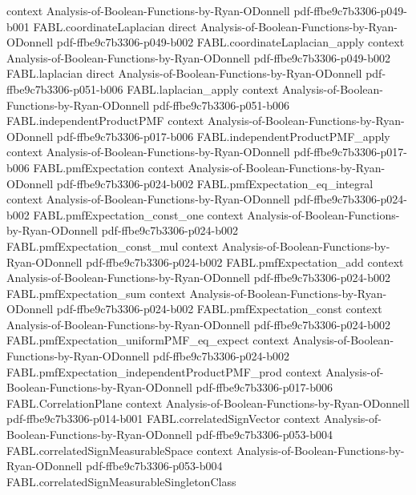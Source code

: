\begin{theorem}
  {context}
  {Analysis-of-Boolean-Functions-by-Ryan-ODonnell}
  {pdf-ffbe9c7b3306-p049-b001}
\proofstep
  {FABL.coordinateLaplacian}
  {direct}
  {Analysis-of-Boolean-Functions-by-Ryan-ODonnell}
  {pdf-ffbe9c7b3306-p049-b002}
\proofstep
  {FABL.coordinateLaplacian_apply}
  {context}
  {Analysis-of-Boolean-Functions-by-Ryan-ODonnell}
  {pdf-ffbe9c7b3306-p049-b002}
\proofstep
  {FABL.laplacian}
  {direct}
  {Analysis-of-Boolean-Functions-by-Ryan-ODonnell}
  {pdf-ffbe9c7b3306-p051-b006}
\proofstep
  {FABL.laplacian_apply}
  {context}
  {Analysis-of-Boolean-Functions-by-Ryan-ODonnell}
  {pdf-ffbe9c7b3306-p051-b006}
\proofstep
  {FABL.independentProductPMF}
  {context}
  {Analysis-of-Boolean-Functions-by-Ryan-ODonnell}
  {pdf-ffbe9c7b3306-p017-b006}
\proofstep
  {FABL.independentProductPMF_apply}
  {context}
  {Analysis-of-Boolean-Functions-by-Ryan-ODonnell}
  {pdf-ffbe9c7b3306-p017-b006}
\proofstep
  {FABL.pmfExpectation}
  {context}
  {Analysis-of-Boolean-Functions-by-Ryan-ODonnell}
  {pdf-ffbe9c7b3306-p024-b002}
\proofstep
  {FABL.pmfExpectation_eq_integral}
  {context}
  {Analysis-of-Boolean-Functions-by-Ryan-ODonnell}
  {pdf-ffbe9c7b3306-p024-b002}
\proofstep
  {FABL.pmfExpectation_const_one}
  {context}
  {Analysis-of-Boolean-Functions-by-Ryan-ODonnell}
  {pdf-ffbe9c7b3306-p024-b002}
\proofstep
  {FABL.pmfExpectation_const_mul}
  {context}
  {Analysis-of-Boolean-Functions-by-Ryan-ODonnell}
  {pdf-ffbe9c7b3306-p024-b002}
\proofstep
  {FABL.pmfExpectation_add}
  {context}
  {Analysis-of-Boolean-Functions-by-Ryan-ODonnell}
  {pdf-ffbe9c7b3306-p024-b002}
\proofstep
  {FABL.pmfExpectation_sum}
  {context}
  {Analysis-of-Boolean-Functions-by-Ryan-ODonnell}
  {pdf-ffbe9c7b3306-p024-b002}
\proofstep
  {FABL.pmfExpectation_const}
  {context}
  {Analysis-of-Boolean-Functions-by-Ryan-ODonnell}
  {pdf-ffbe9c7b3306-p024-b002}
\proofstep
  {FABL.pmfExpectation_uniformPMF_eq_expect}
  {context}
  {Analysis-of-Boolean-Functions-by-Ryan-ODonnell}
  {pdf-ffbe9c7b3306-p024-b002}
\proofstep
  {FABL.pmfExpectation_independentProductPMF_prod}
  {context}
  {Analysis-of-Boolean-Functions-by-Ryan-ODonnell}
  {pdf-ffbe9c7b3306-p017-b006}
\proofstep
  {FABL.CorrelationPlane}
  {context}
  {Analysis-of-Boolean-Functions-by-Ryan-ODonnell}
  {pdf-ffbe9c7b3306-p014-b001}
\proofstep
  {FABL.correlatedSignVector}
  {context}
  {Analysis-of-Boolean-Functions-by-Ryan-ODonnell}
  {pdf-ffbe9c7b3306-p053-b004}
\proofstep
  {FABL.correlatedSignMeasurableSpace}
  {context}
  {Analysis-of-Boolean-Functions-by-Ryan-ODonnell}
  {pdf-ffbe9c7b3306-p053-b004}
\proofstep
  {FABL.correlatedSignMeasurableSingletonClass}

\end{theorem}

